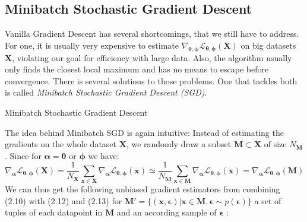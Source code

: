 \documentclass[12pt]{report}
\begin{document}
\subsection{Minibatch Stochastic Gradient Descent} 
Vanilla Gradient Descent has several shortcomings, that we still have to address. For one, it is usually very expensive to estimate $\nabla_{\pmb{\theta}, \pmb{\phi}}\mathcal{L}_{\pmb{\theta}, \pmb{\phi}}(\mathbf{X})$ on big datasets $\mathbf{X}$, violating our goal for efficiency with large data. Also, the algorithm usually only finds the closest local maximum and has no means to escape before convergence. There is several solutions to those problems. One that tackles both is called \emph{Minibatch Stochastic Gradient Descent (SGD)}.
\begin{algorithm}[H]
\SetAlgoLined
{}
\caption{Minibatch Stochastic Gradient Descent}
\end{algorithm} 
The idea behind Minibatch SGD is again intuitive: Instead of estimating the gradients on the whole dataset $\mathbf{X}$, we randomly draw a subset $\mathbf{M} \subset \mathbf{X}$ of size $N_{\mathbf{M}}$. Since for $\pmb{\alpha} = \pmb{\theta}$ or $\pmb{\phi}$ we have:
\begin{equation}
\nabla_{\pmb{\alpha}}\mathcal{L}_{\pmb{\theta}, \pmb{\phi}}(\mathbf{X}) 
= \frac{1}{N_{\mathbf{X}}} \sum_{\mathbf{x} \in \mathbf{X}} \nabla_{\pmb{\alpha}} \mathcal{L}_{\mathbf{\theta}, \mathbf{\phi}}(\mathbf{x}) 
\simeq \frac{1}{N_{\mathbf{M}}} \sum_{\mathbf{x} \in \mathbf{M}} \nabla_{\pmb{\alpha}} \mathcal{L}_{\mathbf{\theta}, \mathbf{\phi}}(\mathbf{x})
= \nabla_{\pmb{\alpha}}\mathcal{L}_{\pmb{\theta}, \pmb{\phi}}(\mathbf{M}) 
\end{equation}
We can thus get the following unbiased gradient estimators from combining (2.10) with (2.12) and (2.13) for $\mathbf{M}'=\{(\mathbf{x}, \pmb{\epsilon}) |  \mathbf{x} \in \mathbf{M}, \pmb{\epsilon} \sim p(\pmb{\epsilon})\}$ a set of tuples of each datapoint in $\mathbf{M}$ and an according sample of $\pmb{\epsilon}$ :
\end{document}
